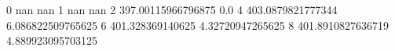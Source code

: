 0 nan nan
1 nan nan
2 397.00115966796875 0.0
4 403.0879821777344 6.086822509765625
6 401.328369140625 4.32720947265625
8 401.8910827636719 4.889923095703125
